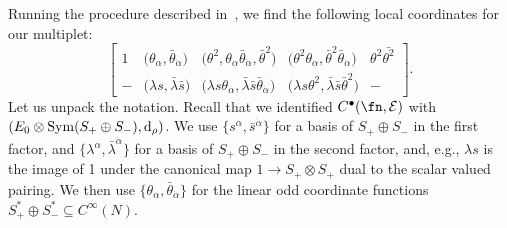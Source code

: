 \documentclass[10pt,a4paper]{amsart}
\numberwithin{equation}{section}
\def\d{{\rm d}}
\DeclareMathOperator{\Sym}{Sym}
\begin{document}
Running the procedure described in~\cite{perspectives}, we find the following local coordinates for our multiplet:
\begin{equation*} %
\begin{bmatrix}
1 & \big(\theta_\alpha,\bar{\theta}_{\dot \alpha}\big) & \big(\theta^2 , \theta_\alpha \bar{\theta}_{\dot \alpha}, \bar{\theta}^2\big) & \big(\theta^2 \theta_\alpha , \bar{\theta}^2 \bar{\theta}_{\dot \alpha}\big) & \theta^2 \bar{\theta^2} \\
- & \big(\lambda s , \bar{\lambda} \bar{s}\big) & \big(\lambda s \theta_\alpha , \bar{\lambda} \bar{s} \bar{\theta}_{\dot \alpha}\big) & \big(\lambda s \theta^2 , \bar{\lambda} \bar{s} \bar{\theta}^2\big) & -
\end{bmatrix}.
\end{equation*}
Let us unpack the notation. Recall that we identified $C^\bullet(\fn, \mathcal E)$ with $(E_0 \otimes \Sym(S_+ \oplus S_-), \d_\rho)$. We use $\big\{s^\alpha, \bar s^{\dot \alpha}\big\}$ for a basis of $S_+ \oplus S_-$ in the first factor, and $\{\lambda^\alpha, \bar \lambda^{\dot \alpha}\}$ for a basis of $S_+ \oplus S_-$ in the second factor, and, e.g., $\lambda s$ is the image of 1 under the canonical map $1 \to S_+ \otimes S_+$ dual to the scalar valued pairing. We then use $\big\{\theta_\alpha, \bar \theta_{\dot \alpha}\big\}$ for the linear odd coordinate functions $S_+^* \oplus S_-^* \subseteq C^\infty(N)$.
\end{document}
